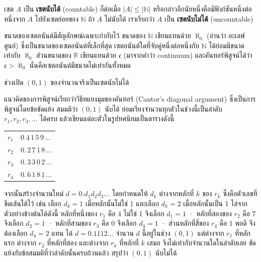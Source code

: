 \begin{definition}
เซต $A$ เป็น \textbf{เซตนับได้} (countable) ก็ต่อเมื่อ $|A| \leq |\mathbb{N}|$ หรือกล่าวอีกนัยหนึ่งคือมีฟังก์ชันหนึ่งต่อหนึ่งจาก $A$ ไปยังเซตย่อยของ $\mathbb{N}$ ถ้า $A$ ไม่นับได้ เราเรียกว่า $A$ เป็น \textbf{เซตนับไม่ได้} (uncountable)
\end{definition}

ขนาดของเซตอนันต์มีสัญลักษณ์เฉพาะกำกับไว้ ขนาดของ $\mathbb{N}$ เขียนแทนด้วย $\aleph_0$ (อ่านว่า อะเลฟศูนย์) ซึ่งเป็นขนาดของเซตอนันต์ที่เล็กที่สุด เซตอนันต์ใดที่จับคู่หนึ่งต่อหนึ่งกับ $\mathbb{N}$ ได้ย่อมมีขนาดเท่ากับ $\aleph_0$ ส่วนขนาดของ $\mathbb{R}$ เขียนแทนด้วย $\mathfrak{c}$ (มาจากคำว่า continuum) และคันทอร์พิสูจน์ได้ว่า $\mathfrak{c} > \aleph_0$ นั่นคือเซตอนันต์มีขนาดไม่เท่ากันทั้งหมด

\begin{thrm}
\label{thrm:interval-uncountable}
ช่วงเปิด $(0, 1)$ ของจำนวนจริงเป็นเซตนับไม่ได้
\end{thrm}

แนวคิดของการพิสูจน์เรียกว่าวิธีทแยงมุมของคันทอร์ (Cantor's diagonal argument) ซึ่งเป็นการพิสูจน์โดยข้อขัดแย้ง สมมติว่า $(0,1)$ นับได้ ย่อมเรียงจำนวนทุกตัวในช่วงนี้เป็นลำดับ $r_1, r_2, r_3, \ldots$ ได้ครบ แล้วเขียนแต่ละตัวในรูปทศนิยมเป็นตารางดังนี้
\begin{center}
\begin{tabular}{r@{\;=\;}l}
$r_1$ & $0.\underline{4}\,1\,5\,9\,\ldots$\\
$r_2$ & $0.\,2\,\underline{7}\,1\,8\,\ldots$\\
$r_3$ & $0.\,3\,3\,\underline{0}\,2\,\ldots$\\
$r_4$ & $0.\,6\,1\,8\,\underline{1}\,\ldots$
\end{tabular}
\end{center}
จากนั้นสร้างจำนวนใหม่ $d = 0.d_1 d_2 d_3 \ldots$ โดยกำหนดให้ $d_k$ ต่างจากหลักที่ $k$ ของ $r_k$ ซึ่งคือตัวเลขที่ขีดเส้นใต้ไว้ เช่น เลือก $d_k = 1$ เมื่อหลักนั้นไม่ใช่ 1 และเลือก $d_k = 2$ เมื่อหลักนั้นเป็น 1 ไล่จากตัวอย่างข้างต้นได้ดังนี้ หลักที่หนึ่งของ $r_1$ คือ 4 ไม่ใช่ 1 จึงเลือก $d_1 = 1$ · หลักที่สองของ $r_2$ คือ 7 จึงเลือก $d_2 = 1$ · หลักที่สามของ $r_3$ คือ 0 จึงเลือก $d_3 = 1$ · ส่วนหลักที่สี่ของ $r_4$ คือ 1 พอดี จึงต้องเลือก $d_4 = 2$ แทน ได้ $d = 0.1112\ldots$ จำนวน $d$ นี้อยู่ในช่วง $(0,1)$ แต่ต่างจาก $r_1$ ที่หลักแรก ต่างจาก $r_2$ ที่หลักที่สอง และต่างจาก $r_k$ ที่หลักที่ $k$ เสมอ จึงไม่เท่ากับจำนวนใดในลำดับเลย ขัดแย้งกับข้อสมมติที่ว่าลำดับนั้นครบถ้วนแล้ว สรุปว่า $(0,1)$ นับไม่ได้~\parencite{enderton1977settheory}

